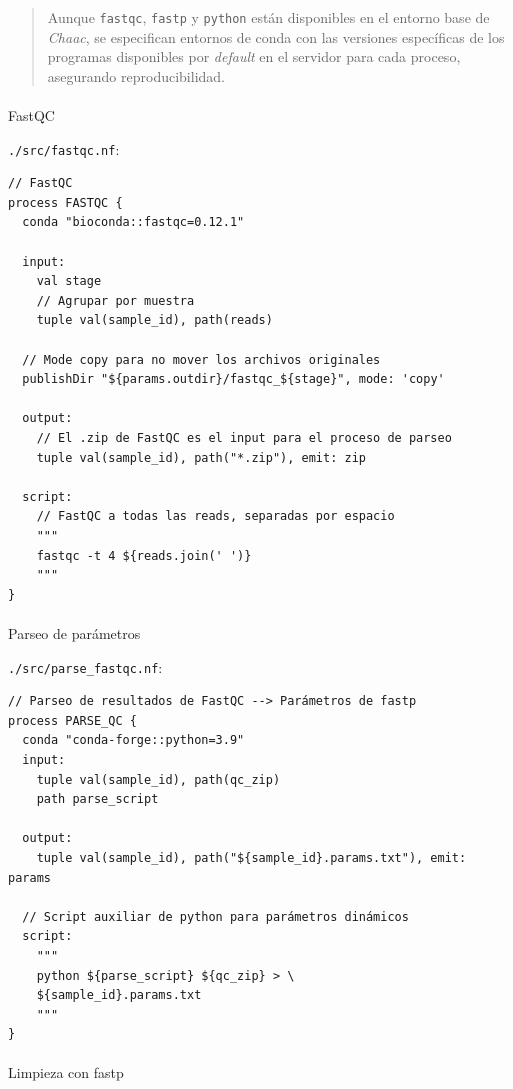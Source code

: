 \documentclass[
  letterpaper,
  DIV=11,
  numbers=noendperiod]{scrartcl}
\makeatletter
\let\oldparagraph\paragraph
\renewcommand{\paragraph}{
    \@ifstar
      \xxxParagraphStar
      \xxxParagraphNoStar
  }
\newcommand{\xxxParagraphStar}[1]{\oldparagraph*{#1}\mbox{}}
\newcommand{\xxxParagraphNoStar}[1]{\oldparagraph{#1}\mbox{}}
\makeatother
\begin{document}
\begin{quote}
Aunque \texttt{fastqc}, \texttt{fastp} y \texttt{python} están
disponibles en el entorno base de \emph{Chaac}, se especifican entornos
de conda con las versiones específicas de los programas disponibles por
\emph{default} en el servidor para cada proceso, asegurando
reproducibilidad.
\end{quote}

\paragraph{FastQC}\label{fastqc}

\texttt{./src/fastqc.nf}:

\begin{verbatim}
// FastQC
process FASTQC {
  conda "bioconda::fastqc=0.12.1"

  input:
    val stage
    // Agrupar por muestra
    tuple val(sample_id), path(reads)

  // Mode copy para no mover los archivos originales
  publishDir "${params.outdir}/fastqc_${stage}", mode: 'copy'

  output:
    // El .zip de FastQC es el input para el proceso de parseo
    tuple val(sample_id), path("*.zip"), emit: zip

  script:
    // FastQC a todas las reads, separadas por espacio
    """
    fastqc -t 4 ${reads.join(' ')}
    """
}
\end{verbatim}

\paragraph{Parseo de parámetros}\label{parseo-de-paruxe1metros}

\texttt{./src/parse\_fastqc.nf}:

\begin{verbatim}
// Parseo de resultados de FastQC --> Parámetros de fastp
process PARSE_QC {
  conda "conda-forge::python=3.9"
  input:
    tuple val(sample_id), path(qc_zip)
    path parse_script

  output:
    tuple val(sample_id), path("${sample_id}.params.txt"), emit: params

  // Script auxiliar de python para parámetros dinámicos
  script:
    """
    python ${parse_script} ${qc_zip} > \
    ${sample_id}.params.txt
    """
}
\end{verbatim}

\paragraph{Limpieza con fastp}\label{limpieza-con-fastp}
\end{document}
